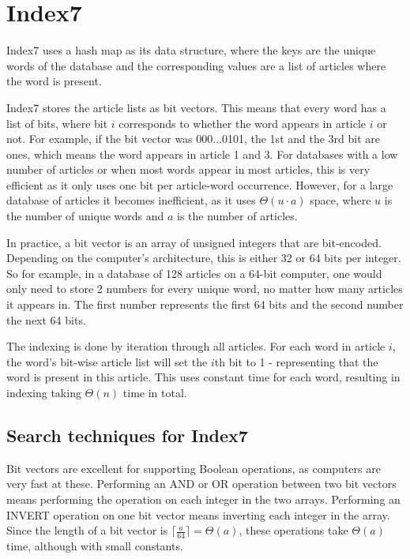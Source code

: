 \section{Index7}
Index7 uses a hash map as its data structure, where the keys are the unique words of the database and the corresponding values are a list of articles where the word is present. 

Index7 stores the article lists as bit vectors. This means that every word has a list of bits, where bit $i$ corresponds to whether the word appears in article $i$ or not. For example, if the bit vector was 000...0101, the 1st and the 3rd bit are ones, which means the word appears in article 1 and 3. For databases with a low number of articles or when most words appear in most articles, this is very efficient as it only uses one bit per article-word occurrence. However, for a large database of articles it becomes inefficient, as it uses $\Theta(u\cdot a)$ space, where $u$ is the number of unique words and $a$ is the number of articles. 

In practice, a bit vector is an array of unsigned integers that are bit-encoded. Depending on the computer's architecture, this is either 32 or 64 bits per integer. So for example, in a database of 128 articles on a 64-bit computer, one would only need to store 2 numbers for every unique word, no matter how many articles it appears in. The first number represents the first 64 bits and the second number the next 64 bits. 

The indexing is done by iteration through all articles. For each word in article $i$, the word's bit-wise article list will set the $i$th bit to 1 - representing that the word is present in this article. This uses constant time for each word, resulting in indexing taking $\Theta(n)$ time in total. 

\subsection{Search techniques for Index7}
Bit vectors are excellent for supporting Boolean operations, as computers are very fast at these. Performing an AND or OR operation between two bit vectors means performing the operation on each integer in the two arrays. Performing an INVERT operation on one bit vector means inverting each integer in the array. Since the length of a bit vector is $\lceil\frac{a}{64}\rceil = \Theta(a)$, these operations take $\Theta(a)$ time, although with small constants. 

